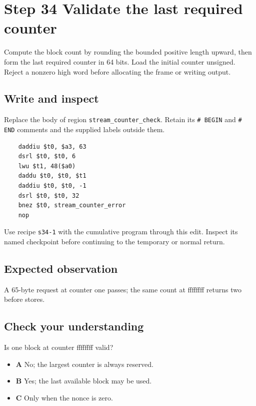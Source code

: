 \section{Step 34 Validate the last required counter}\label{chacha-s34}

Compute the block count by rounding the bounded positive length upward, then form the last required counter in 64 bits. Load the initial counter unsigned. Reject a nonzero high word before allocating the frame or writing output.

\subsection{Write and inspect}
Replace the body of region \texttt{stream\_counter\_check}. Retain its \texttt{\# BEGIN} and \texttt{\# END} comments and the supplied labels outside them.

\begin{verbatim}
    daddiu $t0, $a3, 63
    dsrl $t0, $t0, 6
    lwu $t1, 48($a0)
    daddu $t0, $t0, $t1
    daddiu $t0, $t0, -1
    dsrl $t0, $t0, 32
    bnez $t0, stream_counter_error
    nop
\end{verbatim}

Use recipe \texttt{s34-1} with the cumulative program through this edit. Inspect its named checkpoint before continuing to the temporary or normal return.

\subsection{Expected observation}
A 65-byte request at counter one passes; the same count at ffffffff returns two before stores.

\subsection{Check your understanding}
Is one block at counter ffffffff valid?

\begin{itemize}
  \item \textbf{A} No; the largest counter is always reserved.
  \item \textbf{B} Yes; the last available block may be used.
  \item \textbf{C} Only when the nonce is zero.
\end{itemize}
